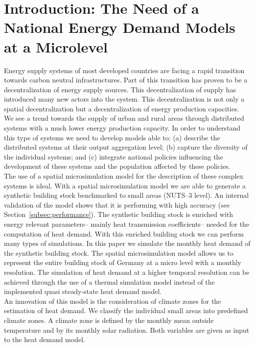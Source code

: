 \documentclass[runningheads,a4paper]{llncs}
\begin{document}
\section{Introduction: The Need of a National Energy Demand Models at a Microlevel}

Energy supply systems of most developed countries are facing a rapid
transition towards carbon neutral infrastructures.
Part of this transition has proven to be a decentralization of energy supply sources.
This decentralization of supply has introduced many new actors into the system.
This decentralization is not only a spatial decentralization but a
decentralization of energy production capacities.
We see a trend towards the supply of urban and rural areas through distributed
systems with a much lower energy production capacity.
In order to understand this type of systems we need to develop models able to:
(a) describe the distributed systems at their output aggregation level;
(b) capture the diversity of the individual systems; and
(c) integrate national policies influencing the development of these systems
and the population affected by these policies.
\\

The use of a spatial microsimulation model for the description of these complex
systems is ideal.
With a spatial microsimulation model we are able to generate a synthetic
building stock benchmarked to small areas (NUTS--3 level).
An internal validation of the model shows that it is performing with high
accuracy (see Section~\ref{subsec:performance}).
The synthetic building stock is enriched with energy relevant parameters--
mainly heat transmission coefficients-- needed for the computation of heat
demand.
With this enriched building stock we can perform many types of simulations.
In this paper we simulate the monthly heat demand of the synthetic building
stock.
The spatial microsimulation model allows us to represent the entire building
stock of Germany at a micro level with a monthly resolution.
The simulation of heat demand at a higher temporal resolution can be achieved
through the use of a thermal simulation model instead of the implemented
quasi steady-state heat demand model.
\\

An innovation of this model is the consideration of climate zones for the
estimation of heat demand.
We classify the individual small areas into predefined climate zones.
A climate zone is defined by the monthly mean outside temperature and by its
monthly solar radiation.
Both variables are given as input to the heat demand model.
\\
\end{document}

